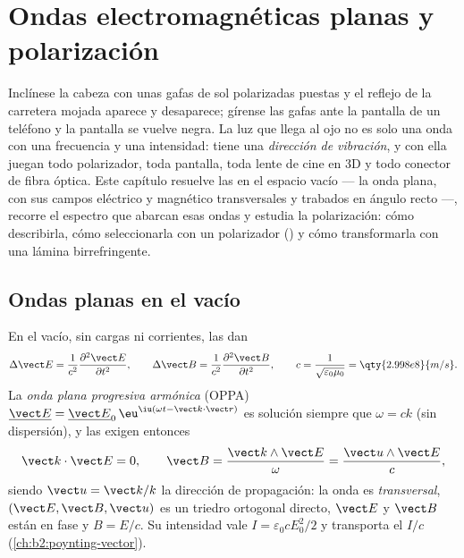 \chapter{Ondas electromagnéticas planas y polarización}\label{ch:b2:plane-waves-polarization}

Inclínese la cabeza con unas gafas de sol polarizadas puestas y el reflejo
de la carretera mojada aparece y desaparece; gírense las gafas ante la
pantalla de un teléfono y la pantalla se vuelve negra. La luz que llega al
ojo no es solo una onda con una frecuencia y una intensidad: tiene una
\emph{dirección de vibración}, y con ella juegan todo polarizador, toda
pantalla, toda lente de cine en 3D y todo conector de fibra óptica. Este
capítulo resuelve las  en el espacio vacío --- la
onda plana, con sus campos eléctrico y magnético transversales y trabados
en ángulo recto ---, recorre el espectro que abarcan esas ondas y estudia
la polarización: cómo describirla, cómo seleccionarla con un polarizador
() y cómo transformarla con una lámina birrefringente.

\section{Ondas planas en el vacío}

\begin{theorem}\label{thm:b2:plane-waves-polarization:wave}
En el vacío, sin cargas ni corrientes, las  dan
\[
\Delta\vect E = \frac1{c^2}\frac{\partial^2\vect E}{\partial t^2} , \qquad
\Delta\vect B = \frac1{c^2}\frac{\partial^2\vect B}{\partial t^2} , \qquad
c = \frac1{\sqrt{\varepsilon_0\mu_0}} = \qty{2.998e8}{m/s} .
\]
La \emph{onda plana progresiva armónica} (OPPA) $\underline{\vect E} =
\underline{\vect E}_0\,\eu^{\iu(\omega t - \vect k\cdot\vect r)}$ es solución siempre que
$\omega = ck$ (sin dispersión), y las  exigen entonces
\[
\vect k\cdot\vect E = 0 , \qquad
\vect B = \frac{\vect k\wedge\vect E}\omega = \frac{\vect u\wedge\vect E}c ,
\]
siendo $\vect u = \vect k/k$ la dirección de propagación: la onda es
\emph{transversal}, $(\vect E, \vect B, \vect u)$ es un triedro ortogonal
directo, $\vect E$ y $\vect B$ están en fase y $B = E/c$. Su intensidad vale
$I = \varepsilon_0cE_0^2/2$ y transporta el  $I/c$
(\cref{ch:b2:poynting-vector}).
\end{theorem}

